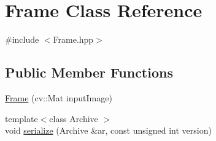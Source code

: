 \hypertarget{classFrame}{}\section{Frame Class Reference}
\label{classFrame}


{\ttfamily \#include $<$Frame.\+hpp$>$}

\subsection*{Public Member Functions}
\begin{DoxyCompactItemize}
\item 
\hyperlink{classFrame_af76c0928474fc6132e92511d8ac0791d}{Frame} (cv\+::\+Mat input\+Image)
\item 
{\footnotesize template$<$class Archive $>$ }\\void \hyperlink{classFrame_a2ad8e5090a32bab1894f2dcd84e50512}{serialize} (Archive \&ar, const unsigned int version)
\end{DoxyCompactItemize}
